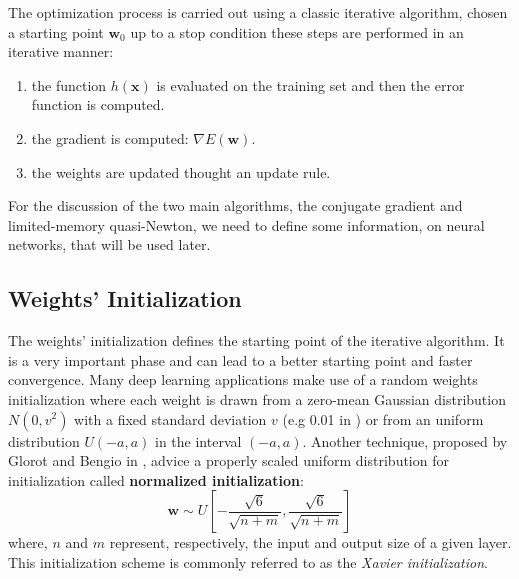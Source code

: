 The optimization process is carried out using a classic iterative algorithm, chosen a starting point $\mathbf{w}_0$ up to a stop condition these steps are performed in an iterative manner:
\begin{enumerate}
    \item the function $h(\mathbf{x})$ is evaluated on the training set and then the error function is computed.
    \item the gradient is computed: $\nabla E(\mathbf{w})$.
    \item the weights are updated thought an update rule.
\end{enumerate}

For the discussion of the two main algorithms, the conjugate gradient and limited-memory quasi-Newton, we need to define some information, on neural networks, that will be used later.

\subsection{Weights' Initialization}
\label{sec:w_init}
The weights' initialization defines the starting point of the iterative algorithm. It is a very important phase and can lead to a better starting point and faster convergence. Many deep learning applications make use of a random weights initialization where each weight is drawn from a zero-mean Gaussian distribution $N(0,v^2)$ with a fixed standard deviation $v$ (e.g 0.01 in \cite{Krizhevsky_imagenetclassification}) or from an uniform distribution $U(-a,a)$ in the interval $(-a, a)$. Another technique, proposed by Glorot and Bengio in \cite{Glorot10understandingthe}, advice a properly scaled uniform distribution for initialization called \textbf{normalized initialization}:
$$ \mathbf{w} \sim U\left[-\frac{\sqrt{6}}{\sqrt{n + m}}, \frac{\sqrt{6}}{\sqrt{n + m}}\right]$$ 
where, $n$ and $m$ represent, respectively, the input and output size of a given layer. This initialization scheme is commonly referred to as the \textit{Xavier initialization}.

